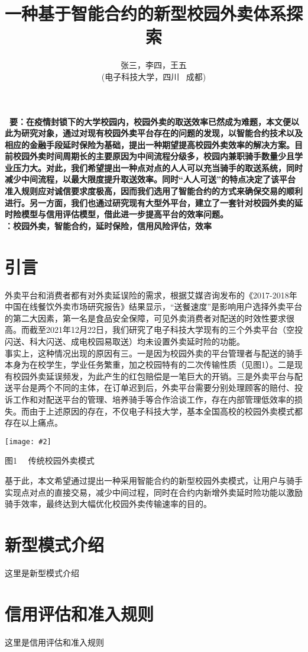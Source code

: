 \documentclass[UTF8]{ctexart}
\title{\textbf{一种基于智能合约的新型校园外卖体系探索}}
\author{\sffamily 张三，李四，王五\\ \sffamily(电子科技大学，四川 \ 成都)}
\date{}
\newcommand\picturehere[2][1]{\centerline{\texttt{[image: \#2]}}}
\newcommand\picfig[1]{\begin{center}\small \heiti #1 \songti \end{center}}
\begin{document}
  \maketitle
  \textbf{ \ 要：\heiti  \small 在疫情封锁下的大学校园内，校园外卖的取送效率已然成为难题，本文便以此为研究对象，通过对现有校园外卖平台存在的问题的发现，以智能合约技术以及相应的金融手段延时保险为基础，提出一种期望提高校园外卖效率的解决方案。目前校园外卖时间周期长的主要原因为中间流程分级多，校园内兼职骑手数量少且学业压力大。对此，我们希望提出一种点对点的人人可以充当骑手的取送系统，同时减少中间流程，以最大限度提升取送效率。同时“人人可送”的特点决定了该平台准入规则应对诚信要求度极高，因而我们选用了智能合约的方式来确保交易的顺利进行。另一方面，我们也通过研究现有大型外平台，建立了一套针对校园外卖的延时险模型与信用评估模型，借此进一步提高平台的效率问题。}
  \\
  \indent
  \textbf{：\heiti  \small 校园外卖，智能合约，延时保险，信用风险评估，效率}
\begin{multicols}{2}
  \setcounter{section}{-1}
  \section{引言}
  外卖平台和消费者都有对外卖延误险的需求，根据艾媒咨询发布的《2017-2018年中国在线餐饮外卖市场研究报告》\cite{None20182017}结果显示，“送餐速度”是影响用户选择外卖平台的第二大因素，第一名是食品安全保障，可见外卖消费者对配送的时效性要求很高。而截至2021年12月22日，我们研究了电子科技大学现有的三个外卖平台（空投闪送、科大闪送、成电校园易取送）均未设置外卖延时险的功能。\\
  \indent 事实上，这种情况出现的原因有三。一是因为校园外卖的平台管理者与配送的骑手本身为在校学生，学业任务繁重，加之校园特有的二次传输性质（见图1）。二是现有校园外卖延误频发，为此产生的红包赔偿是一笔巨大的开销。三是外卖平台与配送平台是两个不同的主体，在订单迟到后，外卖平台需要分别处理顾客的赔付、投诉工作和对配送平台的管理、培养骑手等合作洽谈工作，存在内部管理低效率的损失。而由于上述原因的存在，不仅电子科技大学，基本全国高校的校园外卖模式都存在以上痛点。
  \picturehere[0.6]{image/tradition.png}
  \picfig{图1 \ \ 传统校园外卖模式}%
  \indent 基于此，本文希望通过提出一种采用智能合约的新型校园外卖模式，让用户与骑手实现点对点的直接交易，减少中间过程，同时在合约内新增外卖延时险功能以激励骑手效率，最终达到大幅优化校园外卖传输速率的目的。
  \section{新型模式介绍}
  这里是新型模式介绍
  \section{信用评估和准入规则}
  这里是信用评估和准入规则
\end{multicols}




\end{document}
